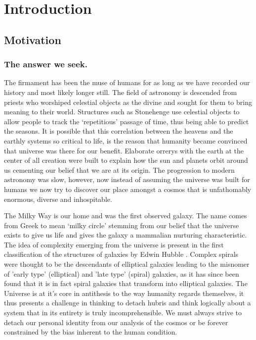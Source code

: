 
\chapter{Introduction} %
\label{Chapter:Intro}

\section{Motivation}
\label{sec:Motivation}

\subsection{The answer we seek.}
The firmament has been the muse of humans for as long as we have recorded our history and most likely longer still. The field of astronomy is descended from priests who worshiped celestial objects as the divine and sought for them to bring meaning to their world. Structures such as Stonehenge use celestial objects to allow people to track the `repetitious' passage of time, thus being able to predict the seasons. It is possible that this correlation between the heavens and the earthly systems so critical to life, is the reason that humanity became convinced that universe was there for our benefit. Elaborate orrerys with the earth at the center of all creation were built to explain how the sun and planets orbit around us cementing our belief that we are at its origin. The progression to modern astronomy was slow, however, now instead of assuming the universe was built for humans we now try to discover our place amongst a cosmos that is unfathomably enormous, diverse and inhospitable. 

The Milky Way is our home and was the first observed galaxy. The name comes from Greek to mean `milky circle' stemming from our belief that the universe exists to give us life and gives the galaxy a mammalian nurturing characteristic. The idea of complexity emerging from the universe is present in the first classification of the structures of galaxies by Edwin Hubble \citep{Hubble1926Extra-galacticNebulae.,Hubble1927TheNebulae}.
Complex spirals were thought to be the descendants of elliptical galaxies leading to the misnomer of 'early type' (elliptical) and 'late type' (spiral) galaxies, as it has since been found that it is in fact spiral galaxies that transform into elliptical galaxies. The Universe is at it's core in antithesis to the way humanity regards themselves, it thus presents a challenge in thinking to detach hubris and think logically about a system that in its entirety is truly incomprehensible. We must always strive to detach our personal identity from our analysis of the cosmos or be forever constrained by the bias inherent to the human condition.

